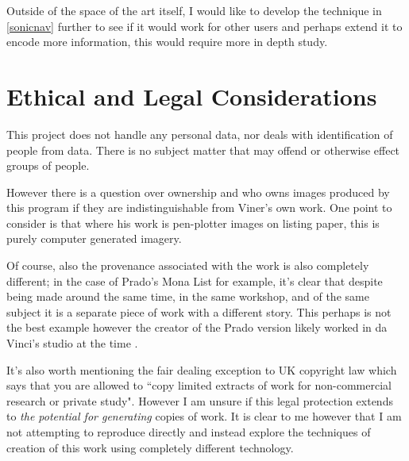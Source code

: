 Outside of the space of the art itself, I would like to develop the technique in
\autoref{sonicnav} further to see if it would work for other users and perhaps
extend it to encode more information, this would require more in depth study.

\section{Ethical and Legal Considerations}
This project does not handle any personal data, nor deals with identification of
people from data. There is no subject matter that may offend or otherwise effect
groups of people. 

However there is a question over ownership and who owns images produced by this
program if they are indistinguishable from Viner's own work.  One point to
consider is that where his work is pen-plotter images on listing paper, this is
purely computer generated imagery. 

Of course, also the provenance associated with the work is also completely
different; in the case of Prado's Mona List for example, it's clear that despite
being made around the same time, in the same workshop, and of the same subject
it is a separate piece of work with a different story. This perhaps is not the
best example however the creator of the Prado version likely worked in da
Vinci's studio at the time \citep{museodelprado_MonaLisa}. 

It's also worth mentioning the fair dealing exception to UK copyright law which
says that you are allowed to ``copy limited extracts of work for non-commercial
research or private study"\citep{govuk_copyright}. However I am unsure if this
legal protection extends to \emph{the potential for generating} copies of work.
It is clear to me however that I am not attempting to reproduce directly and
instead explore the techniques of creation of this work using completely
different technology.
